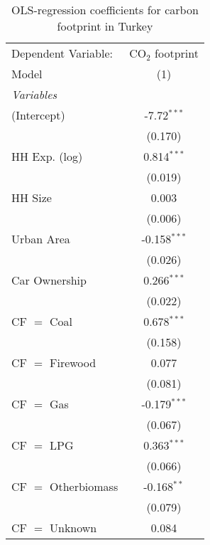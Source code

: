
\begin{table}[htbp!]
   \centering
   \small
   \begin{adjustbox}{width = 1\textwidth, max height = 0.95\textheight, center}
      \begin{threeparttable}[b]
         \caption{\label{tab:OLS_2_TUR} OLS-regression coefficients for carbon footprint in Turkey}
         \begin{tabular}{lc}
            \tabularnewline \midrule \midrule
            Dependent Variable: & CO$_{2}$ footprint\\  
            Model               & (1)\\  
            \midrule
            \emph{Variables}\\
            (Intercept)         & -7.72$^{***}$\\   
                                & (0.170)\\   
            HH Exp. (log)       & 0.814$^{***}$\\   
                                & (0.019)\\   
            HH Size             & 0.003\\   
                                & (0.006)\\   
            Urban Area          & -0.158$^{***}$\\   
                                & (0.026)\\   
            Car Ownership       & 0.266$^{***}$\\   
                                & (0.022)\\   
            CF $=$ Coal         & 0.678$^{***}$\\   
                                & (0.158)\\   
            CF $=$ Firewood     & 0.077\\   
                                & (0.081)\\   
            CF $=$ Gas          & -0.179$^{***}$\\   
                                & (0.067)\\   
            CF $=$ LPG          & 0.363$^{***}$\\   
                                & (0.066)\\   
            CF $=$ Otherbiomass & -0.168$^{**}$\\   
                                & (0.079)\\   
            CF $=$ Unknown      & 0.084\\   

\end{tabular}
\end{threeparttable}
\end{adjustbox}
\end{table}
